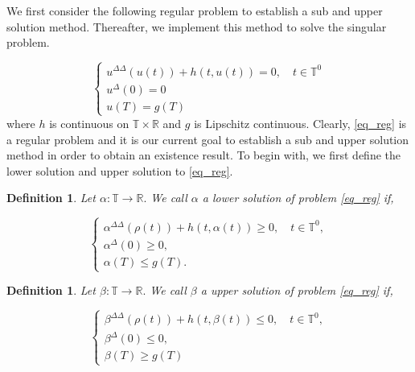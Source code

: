 \documentclass[12pt,reqno]{amsart}
\newtheorem{definition}[theorem]{Definition}
\begin{document}
We first consider the following regular problem to establish a sub and upper solution method. Thereafter, we implement this method to solve the singular problem. 

\begin{equation}\label{eq_reg}
\begin{cases}
u^{\Delta\Delta}(u(t)) + h(t, u(t)) = 0, \quad t \in \mathbb{T}^0\\
u^{\Delta}(0)=0\\
u(T)=g(T)
\end{cases}
\end{equation}
where $h$ is continuous on $\mathbb{T} \times \mathbb{R}$ and $g$ is Lipschitz continuous. Clearly, \eqref{eq_reg} is a regular problem and it is our current goal to establish a sub and upper solution method in order to obtain an existence result. To begin with, we first define the lower solution and upper solution to \eqref{eq_reg}.

\begin{definition}
	Let $\alpha : \mathbb{T} \rightarrow \mathbb{R}.$  We call $\alpha$ a lower solution of problem \eqref{eq_reg} if, 
	
	\begin{equation}\label{low_eq}
 \begin{cases}
  \alpha^{\Delta\Delta}(\rho(t)) + h(t, \alpha(t)) \geq 0, \quad t \in \mathbb{T}^0,\\
  \alpha^{\Delta}(0) \geq 0,\\
  \alpha(T) \leq g(T).
 \end{cases}
\end{equation}

\end{definition}
 
\begin{definition}
	Let $\beta : \mathbb{T} \rightarrow \mathbb{R}.$  We call $\beta$ a upper solution of problem \eqref{eq_reg} if, 
	
	\begin{equation}\label{up_eq}
 \begin{cases}
   \beta^{\Delta\Delta}(\rho(t)) + h(t, \beta(t)) \leq 0, \quad t \in \mathbb{T}^0,\\
   \beta^{\Delta}(0) \leq 0,\\
   \beta(T) \geq g(T)
 \end{cases}
\end{equation}
\end{definition}
\end{document}

